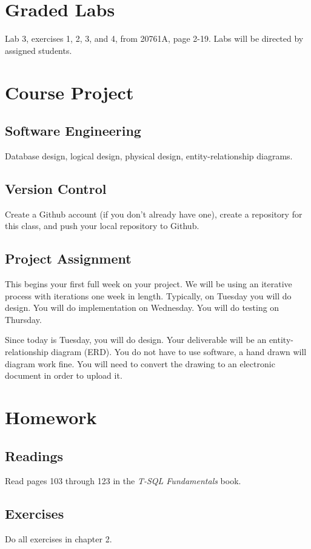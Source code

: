 \documentclass{article}
\begin{document}
    \section{Graded Labs}

Lab 3, exercises 1, 2, 3, and 4, from 20761A, page 2-19. Labs will be directed by assigned students.



    \section{Course Project}


        \subsection{Software Engineering}

        Database design, logical design, physical design, entity-relationship diagrams.
        
        \subsection{Version Control}

        Create a Github account (if you don't already have one), create a repository for this class, and push your local repository to Github.

        \subsection{Project Assignment}

        This begins your first full week on your project. We will be using an iterative process with iterations one week in length. Typically, on Tuesday you will do design. You will do implementation on Wednesday. You will do testing on Thursday.

        Since today is Tuesday, you will do design. Your deliverable will be an entity-relationship diagram (ERD). You do not have to use software, a hand drawn will diagram work fine. You will need to convert the drawing to an electronic document in order to upload it.  

    \section{Homework}


        \subsection{Readings}

        Read pages 103 through 123 in the \textit{T-SQL Fundamentals} book.
        
        \subsection{Exercises}

        Do all exercises in chapter 2.
\end{document}
